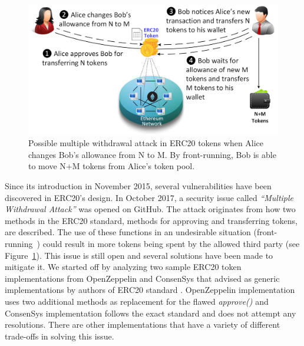 
\begin{figure}[t!]
	\centering
	\includegraphics[width=1.0\linewidth]{figures/multiple_withdrawal_02.png}
	\caption{Possible multiple withdrawal attack in ERC20 tokens when Alice changes Bob's allowance from N to M. By front-running, Bob is able to move N+M tokens from Alice's token pool.\label{fig:mwa}}
\end{figure}

Since its introduction in November 2015, several vulnerabilities have been discovered in ERC20's design. In October 2017, a security issue called \textit{``Multiple Withdrawal Attack''} was opened on GitHub\cite{Ref13,Ref07}. The attack originates from how two methods in the ERC20 standard, methods for approving and transferring tokens, are described. The use of these functions in an undesirable situation (\eg front-running~\cite{eskandari2019sok}) could result in more tokens being spent by the allowed third party (see Figure~\ref{fig:mwa}). This issue is still open and several solutions have been made to mitigate it. We started off by analyzing two sample ERC20 token implementations from OpenZeppelin\cite{Ref10} and ConsenSys\cite{Ref11} that advised as generic implementations by authors of ERC20 standard \cite{Ref08}. OpenZeppelin implementation uses two additional methods as replacement for the flawed \textit{approve()} and ConsenSys implementation follows the exact standard and does not attempt any resolutions. There are other implementations that have a variety of different trade-offs in solving this issue. 

